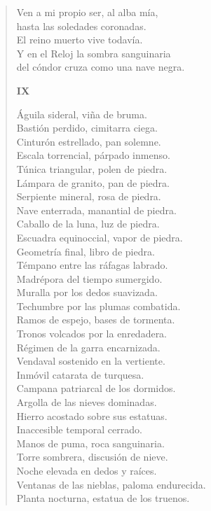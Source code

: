 \documentclass[12pt]{article}
\begin{document}
\begin{verse}
Ven a mi propio ser, al alba mía,\\
hasta las soledades coronadas.\\
El reino muerto vive todavía.\\
Y en el Reloj la sombra sanguinaria\\
del cóndor cruza como una nave negra.  

{\bfseries\scshape {IX}}

Águila sideral, viña de bruma.\\
Bastión perdido, cimitarra ciega.\\
Cinturón estrellado, pan solemne.\\
Escala torrencial, párpado inmenso.\\
Túnica triangular, polen de piedra.\\
Lámpara de granito, pan de piedra.\\
Serpiente mineral, rosa de piedra.\\
Nave enterrada, manantial de piedra.\\
Caballo de la luna, luz de piedra.\\
Escuadra equinoccial, vapor de piedra.\\
Geometría final, libro de piedra.\\
Témpano entre las ráfagas labrado.\\
Madrépora del tiempo sumergido.\\
Muralla por los dedos suavizada.\\
Techumbre por las plumas combatida.\\
Ramos de espejo, bases de tormenta.\\
Tronos volcados por la enredadera.\\
Régimen de la garra encarnizada.\\
Vendaval sostenido en la vertiente.\\
Inmóvil catarata de turquesa.\\
Campana patriarcal de los dormidos.\\
Argolla de las nieves dominadas.\\
Hierro acostado sobre sus estatuas.\\
Inaccesible temporal cerrado.\\
Manos de puma, roca sanguinaria.\\
Torre sombrera, discusión de nieve.\\
Noche elevada en dedos y raíces.\\
Ventanas de las nieblas, paloma endurecida.\\
Planta nocturna, estatua de los truenos.\\

\end{verse}
\end{document}
